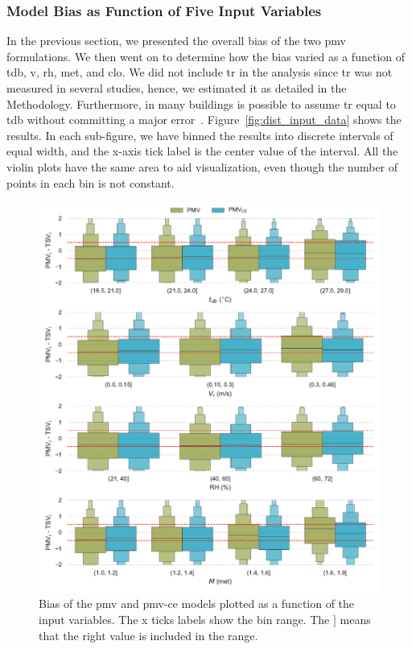 \subsubsection{Model Bias as Function of Five Input Variables}\label{subsubsec:model-bias-variable}
In the previous section, we presented the overall bias of the two \ac{pmv} formulations.
We then went on to determine how the bias varied as a function of \ac{tdb}, \ac{v}, \ac{rh}, \ac{met}, and \ac{clo}.
We did not include \ac{tr} in the analysis since \ac{tr} was not measured in several studies, hence, we estimated it as detailed in the Methodology.
Furthermore, in many buildings is possible to assume \ac{tr} equal to \ac{tdb} without committing a major error~\cite{Dawe2020}.
Figure~\ref{fig:dist_input_data} shows the results.
In each sub-figure, we have binned the results into discrete intervals of equal width, and the x-axis tick label is the center value of the interval.
All the violin plots have the same area to aid visualization, even though the number of points in each bin is not constant.
\begin{figure}[htb!]
    \centering
    \includegraphics[width=\textwidth]{figures/bias_models}
    \caption{Bias of the \ac{pmv} and \ac{pmv-ce} models plotted as a function of the input variables.
    The x ticks labels show the bin range.
    The $]$ means that the right value is included in the range.
    }
    \label{fig:bias_models}
\end{figure}
